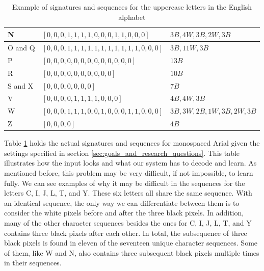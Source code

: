 \begin{table}[H]
\begin{tabular}{|l|l|l|}
        N                     & \([0, 0, 0, 1, 1, 1, 1, 0, 0, 0, 1, 1, 0, 0, 0]\)       & \(3B, 4W, 3B, 2W, 3B\)         \\ \hline
        O and Q               & \([0, 0, 0, 1, 1, 1, 1, 1, 1, 1, 1, 1, 1, 1, 0, 0, 0]\) & \(3B, 11W, 3B\)                \\ \hline
        P                     & \([0, 0, 0, 0, 0, 0, 0, 0, 0, 0, 0, 0, 0]\)             & \(13B\)                        \\ \hline
        R                     & \([0, 0, 0, 0, 0, 0, 0, 0, 0, 0]\)                      & \(10B\)                        \\ \hline
        S and X               & \([0, 0, 0, 0, 0, 0, 0]\)                               & \(7B\)                         \\ \hline
        V                     & \([0, 0, 0, 0, 1, 1, 1, 1, 0, 0, 0]\)                   & \(4B, 4W, 3B\)                 \\ \hline
        W                     & \([0, 0, 0, 1, 1, 1, 0, 0, 1, 0, 0, 0, 1, 1, 0, 0, 0]\) & \(3B, 3W, 2B, 1W, 3B, 2W, 3B\) \\ \hline
        Z                     & \([0, 0, 0, 0]\)                                        & \(4B\)                         \\ \hline
    \end{tabular}
    \captionsetup{justification=centering}
    \caption{Example of signatures and sequences for the uppercase letters in the English alphabet}
    \label{table:signature_sequence_example}
\end{table}

Table \ref{table:signature_sequence_example} holds the actual signatures and sequences for monospaced Arial given the settings specified in section \ref{sec:goals_and_research_questions}. This table illustrates how the input looks and what our system has to decode and learn. As mentioned before, this problem may be very difficult, if not impossible, to learn fully. We can see examples of why it may be difficult in the sequences for the letters C, I, J, L, T, and Y. These six letters all share the same sequence. With an identical sequence, the only way we can differentiate between them is to consider the white pixels before and after the three black pixels.  In addition, many of the other character sequences besides the ones for C, I, J, L, T, and Y contains three black pixels after each other. In total, the subsequence of three black pixels is found in eleven of the seventeen unique character sequences. Some of them, like W and N, also contains three subsequent black pixels multiple times in their sequences. 

